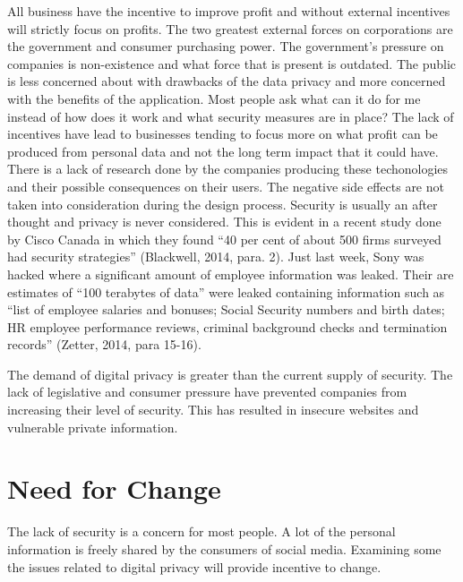 \documentclass[12pt]{article}
\begin{document}
All business have the incentive to improve profit and without external incentives will strictly focus on profits. The two greatest external forces on corporations are the government and consumer purchasing power. The government's pressure on companies is non-existence and what force that is present is outdated. The public is less concerned about with drawbacks of the data privacy and more concerned with the benefits of the application. Most people ask what can it do for me instead of how does it work and what security measures are in place? The lack of incentives have lead to businesses tending to focus more on what profit can be produced from personal data and not the long term impact that it could have. There is a lack of research done by the companies producing these techonologies and their possible consequences on their users. The negative side effects are not taken into consideration during the design process. Security is usually an after thought and privacy is never considered. This is evident in a recent study done by Cisco Canada in which they found ``40 per cent of about 500 firms surveyed had security strategies'' (Blackwell, 2014, para. 2). Just last week, Sony was hacked where a significant amount of employee information was leaked. Their are estimates of ``100 terabytes of data'' were leaked containing information such as ``list of employee salaries and bonuses; Social Security numbers and birth dates; HR employee performance reviews, criminal background checks and termination records'' (Zetter, 2014, para 15-16).

The demand of digital privacy is greater than the current supply of security. The lack of legislative and consumer pressure have prevented companies from increasing their level of security. This has resulted in insecure websites and vulnerable private information. 

\section{Need for Change}\label{sec:change}
The lack of security is a concern for most people. A lot of the personal information is freely shared by the consumers of social media. Examining some the issues related to digital privacy will provide incentive to change.
\end{document}
